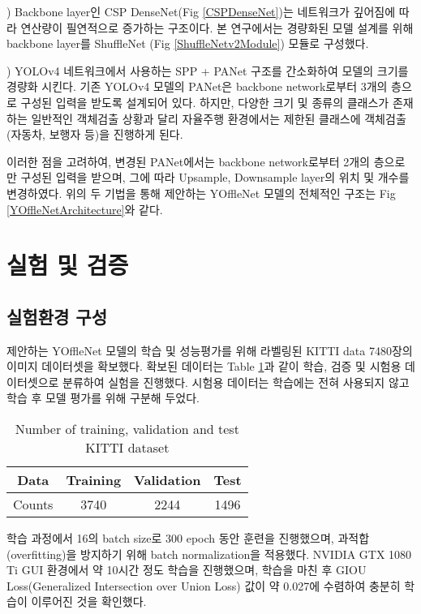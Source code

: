 \documentclass[10pt,twocolumn,letterpaper]{article}
\begin{document}
) Backbone layer인 CSP DenseNet(Fig \ref{CSPDenseNet})는 네트워크가 깊어짐에 따라 연산량이 필연적으로 증가하는 구조이다. 본 연구에서는 경량화된 모델 설계를 위해 backbone layer를 ShuffleNet (Fig \ref{ShuffleNetv2Module}) 모듈로 구성했다.

) YOLOv4 네트워크에서 사용하는 SPP + PANet 구조를 간소화하여 모델의 크기를 경량화 시킨다. 기존 YOLOv4 모델의 PANet은 backbone network로부터 3개의 층으로 구성된 입력을 받도록 설계되어 있다. 하지만, 다양한 크기 및 종류의 클래스가 존재하는 일반적인 객체검출 상황과 달리 자율주행 환경에서는 제한된 클래스에 객체검출(자동차, 보행자 등)을 진행하게 된다. 

이러한 점을 고려하여, 변경된 PANet에서는 backbone network로부터 2개의 층으로만 구성된 입력을 받으며, 그에 따라 Upsample, Downsample layer의 위치 및 개수를 변경하였다. 위의 두 기법을 통해 제안하는 YOffleNet 모델의 전체적인 구조는 Fig \ref{YOffleNetArchitecture}와 같다.



\vspace{.25cm}
\section{실험 및 검증}
\vspace{.25cm}
\subsection{실험환경 구성}
제안하는 YOffleNet 모델의 학습 및 성능평가를 위해 라벨링된 KITTI data 7480장의 이미지 데이터셋을 확보했다. 확보된 데이터는 Table \ref{NumberofDataset}과 같이 학습, 검증 및 시험용 데이터셋으로 분류하여 실험을 진행했다. 시험용 데이터는 학습에는 전혀 사용되지 않고 학습 후 모델 평가를 위해 구분해 두었다.

\begin{table}[h]
\captionsetup{singlelinecheck = false, format= hang, justification=raggedright, labelsep=space}
\begin{center}
\begin{tabular}{|c|c|c|c|}
\hline
Data & Training & Validation & Test \\
\hline
Counts & 3740 & 2244 & 1496 \\
\hline
\end{tabular}
\end{center}
\caption{Number of training, validation and test KITTI dataset}
\label{NumberofDataset}
\end{table}

학습 과정에서 16의 batch size로 300 epoch 동안 훈련을 진행했으며, 과적합(overfitting)을 방지하기 위해 batch normalization을 적용했다. NVIDIA GTX 1080 Ti GUI 환경에서 약 10시간 정도 학습을 진행했으며, 학습을 마친 후 GIOU Loss(Generalized Intersection over Union Loss) 값이 약 0.027에 수렴하여 충분히 학습이 이루어진 것을 확인했다.
\end{document}
